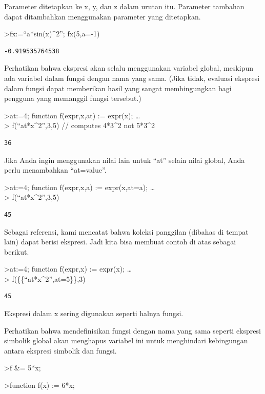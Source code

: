 \documentclass[
]{book}
\begin{document}
Parameter ditetapkan ke x, y, dan z dalam urutan itu. Parameter tambahan dapat ditambahkan menggunakan parameter yang ditetapkan.

\textgreater fx:=``a*sin(x)\^{}2''; fx(5,a=-1)

\begin{verbatim}
-0.919535764538
\end{verbatim}

Perhatikan bahwa ekspresi akan selalu menggunakan variabel global, meskipun ada variabel dalam fungsi dengan nama yang sama. (Jika tidak, evaluasi ekspresi dalam fungsi dapat memberikan hasil yang sangat membingungkan bagi pengguna yang memanggil fungsi tersebut.)

\textgreater at:=4; function f(expr,x,at) := expr(x); \ldots{}\\
\textgreater{} f(``at*x\^{}2'',3,5) // computes 4*3\^{}2 not 5*3\^{}2

\begin{verbatim}
36
\end{verbatim}

Jika Anda ingin menggunakan nilai lain untuk ``at'' selain nilai global, Anda perlu menambahkan ``at=value''.

\textgreater at:=4; function f(expr,x,a) := expr(x,at=a); \ldots{}\\
\textgreater{} f(``at*x\^{}2'',3,5)

\begin{verbatim}
45
\end{verbatim}

Sebagai referensi, kami mencatat bahwa koleksi panggilan (dibahas di tempat lain) dapat berisi ekspresi. Jadi kita bisa membuat contoh di atas sebagai berikut.

\textgreater at:=4; function f(expr,x) := expr(x); \ldots{}\\
\textgreater{} f(\{\{``at*x\^{}2'',at=5\}\},3)

\begin{verbatim}
45
\end{verbatim}

Ekspresi dalam x sering digunakan seperti halnya fungsi.

Perhatikan bahwa mendefinisikan fungsi dengan nama yang sama seperti ekspresi simbolik global akan menghapus variabel ini untuk menghindari kebingungan antara ekspresi simbolik dan fungsi.

\textgreater f \&= 5*x;

\textgreater function f(x) := 6*x;
\end{document}
